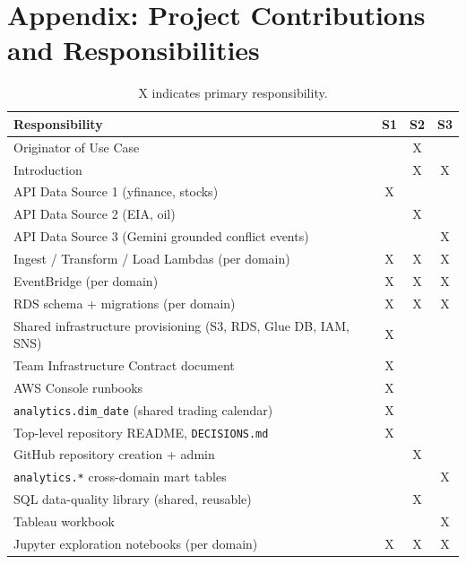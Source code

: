 \documentclass[11pt,a4paper]{article}
\begin{document}
\section{Appendix: Project Contributions and Responsibilities}
\label{appx:code_leads}

\begin{table}[H]
  \centering
  \caption[Project Contributions and Responsibilities]{X indicates primary responsibility.}
  \label{tab:code_leads}
  \small
  \begin{tabularx}{\textwidth}{@{} X c c c @{}}
    \toprule
    \textbf{Responsibility} & \textbf{S1} & \textbf{S2} & \textbf{S3} \\
    \midrule
    Originator of Use Case                                   &    & X  &    \\
    Introduction                                   &    & X  & X  \\
    API Data Source 1 (yfinance, stocks)                               & X  &    &    \\
    API Data Source 2 (EIA, oil)                                       &    & X  &    \\
    API Data Source 3 (Gemini grounded conflict events)                            &    &    & X  \\
    Ingest / Transform / Load Lambdas (per domain)                     & X  & X  & X  \\
    EventBridge (per domain)                          & X  & X  & X  \\
    RDS schema + migrations (per domain)                               & X  & X  & X  \\
    Shared infrastructure provisioning (S3, RDS, Glue DB, IAM, SNS)    & X  &    &    \\
    Team Infrastructure Contract document                              & X  &    &    \\
    AWS Console runbooks                                               & X  &    &    \\
    \texttt{analytics.dim\_date} (shared trading calendar)             & X  &    &    \\
    Top-level repository README, \texttt{DECISIONS.md}                 & X  &    &    \\
    GitHub repository creation + admin                                 &    & X  &    \\
    \texttt{analytics.*} cross-domain mart tables                      &    &    & X  \\
    SQL data-quality library (shared, reusable)                        &    & X  &    \\
    Tableau workbook                                                   &    &    & X  \\
    Jupyter exploration notebooks (per domain)                         & X  & X  & X  \\
    \bottomrule
  \end{tabularx}
\end{table}
\end{document}
